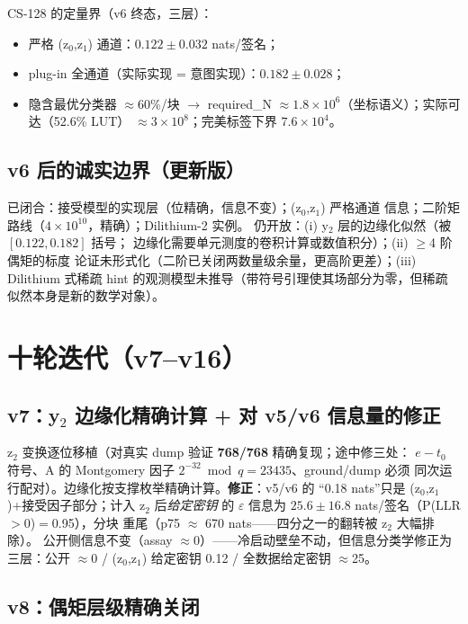 \documentclass[11pt,a4paper]{ctexart}
\begin{document}
CS-128 的定量界（v6 终态，三层）：
\begin{itemize}
  \item 严格 (z$_0$,z$_1$) 通道：$0.122\pm0.032$ nats/签名；
  \item plug-in 全通道（实际实现 = 意图实现）：$0.182\pm0.028$；
  \item 隐含最优分类器 $\approx$60\%/块 $\to$ required\_N
        $\approx1.8\times10^6$（坐标语义）；实际可达（52.6\% LUT）
        $\approx3\times10^8$；完美标签下界 $7.6\times10^4$。
\end{itemize}

\subsection{v6 后的诚实边界（更新版）}

已闭合：接受模型的实现层（位精确，信息不变）；(z$_0$,z$_1$) 严格通道
信息；二阶矩路线（$4\times10^{10}$，精确）；Dilithium-2 实例。
仍开放：(i) y$_2$ 层的边缘化似然（被 $[0.122, 0.182]$ 括号；
边缘化需要单元测度的卷积计算或数值积分）；(ii) $\ge$4 阶偶矩的标度
论证未形式化（二阶已关闭两数量级余量，更高阶更差）；(iii) Dilithium
式稀疏 hint 的观测模型未推导（带符号引理使其场部分为零，但稀疏
似然本身是新的数学对象）。

\section{十轮迭代（v7--v16）}

\subsection{v7：y$_2$ 边缘化精确计算 + 对 v5/v6 信息量的修正}

z$_2$ 变换逐位移植（对真实 dump 验证 \textbf{768/768} 精确复现；途中修三处：
$e-t_0$ 符号、A 的 Montgomery 因子 $2^{-32}\bmod q=23435$、ground/dump 必须
同次运行配对）。边缘化按支撑枚举精确计算。\textbf{修正}：v5/v6 的
``0.18 nats''只是 (z$_0$,z$_1$)+接受因子部分；计入 z$_2$ 后\emph{给定密钥}
的 $\varepsilon$ 信息为 $25.6\pm16.8$ nats/签名（P(LLR$>$0)$=$0.95），分块
重尾（p75 $\approx$ 670 nats——四分之一的翻转被 z$_2$ 大幅排除）。
公开侧信息不变（assay $\approx$0）——冷启动壁垒不动，但信息分类学修正为
三层：公开 $\approx$0 / (z$_0$,z$_1$) 给定密钥 0.12 / 全数据给定密钥 $\approx$25。

\subsection{v8：偶矩层级精确关闭}
\end{document}
